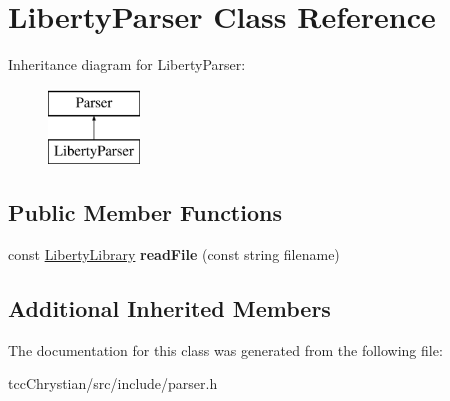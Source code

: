 \hypertarget{classLibertyParser}{\section{Liberty\-Parser Class Reference}
\label{classLibertyParser}
}
Inheritance diagram for Liberty\-Parser\-:\begin{figure}[H]
\begin{center}
\leavevmode
\includegraphics[height=2.000000cm]{classLibertyParser}
\end{center}
\end{figure}
\subsection*{Public Member Functions}
\begin{DoxyCompactItemize}
\item 
\hypertarget{classLibertyParser_a474451e29a86949f6ebef6948363874d}{const \hyperlink{classLibertyLibrary}{Liberty\-Library} {\bfseries read\-File} (const string filename)}\label{classLibertyParser_a474451e29a86949f6ebef6948363874d}

\end{DoxyCompactItemize}
\subsection*{Additional Inherited Members}


The documentation for this class was generated from the following file\-:\begin{DoxyCompactItemize}
\item 
tcc\-Chrystian/src/include/parser.\-h\end{DoxyCompactItemize}
